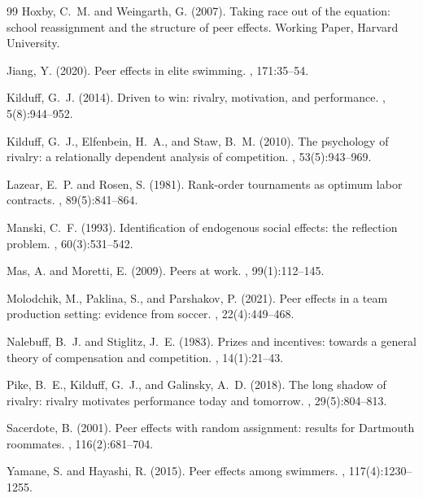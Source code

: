 \documentclass[12pt]{article}
\theoremstyle{definition}
\theoremstyle{remark}
\begin{document}
\begin{thebibliography}{99}
Hoxby, C.~M. and Weingarth, G. (2007).
\newblock Taking race out of the equation: school reassignment and the
structure of peer effects.
\newblock Working Paper, Harvard University.

Jiang, Y. (2020).
\newblock Peer effects in elite swimming.
, 171:35--54.

Kilduff, G.~J. (2014).
\newblock Driven to win: rivalry, motivation, and performance.
, 5(8):944--952.

Kilduff, G.~J., Elfenbein, H.~A., and Staw, B.~M. (2010).
\newblock The psychology of rivalry: a relationally dependent analysis of competition.
, 53(5):943--969.

Lazear, E.~P. and Rosen, S. (1981).
\newblock Rank-order tournaments as optimum labor contracts.
, 89(5):841--864.

Manski, C.~F. (1993).
\newblock Identification of endogenous social effects: the reflection problem.
, 60(3):531--542.

Mas, A. and Moretti, E. (2009).
\newblock Peers at work.
, 99(1):112--145.

Molodchik, M., Paklina, S., and Parshakov, P. (2021).
\newblock Peer effects in a team production setting: evidence from soccer.
, 22(4):449--468.

Nalebuff, B.~J. and Stiglitz, J.~E. (1983).
\newblock Prizes and incentives: towards a general theory of compensation and competition.
, 14(1):21--43.

Pike, B.~E., Kilduff, G.~J., and Galinsky, A.~D. (2018).
\newblock The long shadow of rivalry: rivalry motivates performance today and tomorrow.
, 29(5):804--813.

Sacerdote, B. (2001).
\newblock Peer effects with random assignment: results for Dartmouth roommates.
, 116(2):681--704.

Yamane, S. and Hayashi, R. (2015).
\newblock Peer effects among swimmers.
, 117(4):1230--1255.

\end{thebibliography}
\end{document}

